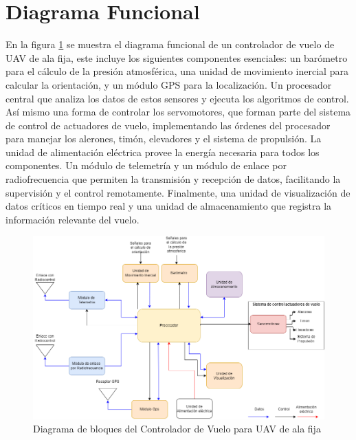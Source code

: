 \clearpage
\section{Diagrama Funcional}
En la figura \ref{fig:bloques} se muestra el diagrama funcional de un controlador de vuelo de UAV de ala fija, este incluye los siguientes componentes esenciales: un barómetro para el cálculo de la presión atmosférica, una unidad de movimiento inercial para calcular la orientación, y un módulo GPS para la localización. Un procesador central que analiza los datos de estos sensores y ejecuta los algoritmos de control. Así mismo una forma de controlar los servomotores, que forman parte del sistema de control de actuadores de vuelo, implementando las órdenes del procesador para manejar los alerones, timón, elevadores y el sistema de propulsión. La unidad de alimentación eléctrica provee la energía necesaria para todos los componentes. Un módulo de telemetría y un módulo de enlace por radiofrecuencia que permiten la transmisión y recepción de datos, facilitando la supervisión y el  control remotamente. Finalmente, una unidad de visualización de datos críticos en tiempo real y una unidad de almacenamiento que registra la información relevante del vuelo.
\begin{figure}[H]
    \centering
    \includegraphics[width=\textwidth]{Imagenes/funcional/Diagrama funcional.png}
    \caption{Diagrama de bloques del Controlador de Vuelo para UAV de ala fija }
    \label{fig:bloques}
\end{figure}







